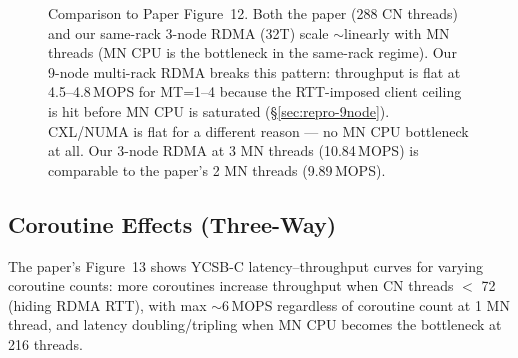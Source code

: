 \documentclass[conference]{IEEEtran}
\begin{document}
\begin{figure}[H]
\centering
{}
\caption{Comparison to Paper Figure~12. Both the paper (288 CN threads) and our same-rack 3-node RDMA (32T) scale $\sim$linearly with MN threads (MN CPU is the bottleneck in the same-rack regime). Our 9-node multi-rack RDMA breaks this pattern: throughput is flat at 4.5--4.8\,MOPS for MT=1--4 because the RTT-imposed client ceiling is hit before MN CPU is saturated (\S\ref{sec:repro-9node}). CXL/NUMA is flat for a different reason --- no MN CPU bottleneck at all. Our 3-node RDMA at 3 MN threads (10.84\,MOPS) is comparable to the paper's 2 MN threads (9.89\,MOPS).}
\label{fig:paper-fig12-cmp}
\end{figure}

\subsection{Coroutine Effects (Three-Way)}

The paper's Figure~13 shows YCSB-C latency--throughput curves for varying coroutine counts: more coroutines increase throughput when CN threads $<$ 72 (hiding RDMA RTT), with max $\sim$6\,MOPS regardless of coroutine count at 1 MN thread, and latency doubling/tripling when MN CPU becomes the bottleneck at 216 threads.
\end{document}
